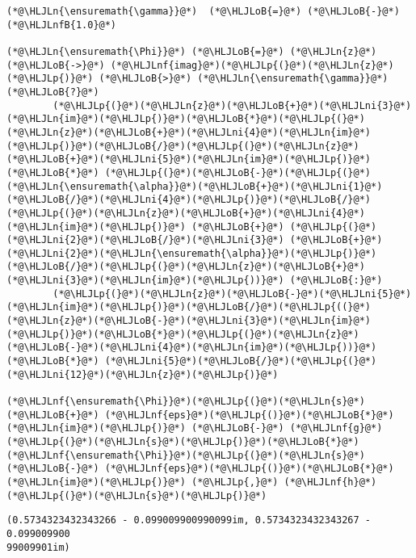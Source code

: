\documentclass[12pt,a4paper]{article}
\newcommand{\HLJLn}[1]{#1}
\newcommand{\HLJLnf}[1]{\textcolor[RGB]{66,102,213}{#1}}
\newcommand{\HLJLnfB}[1]{\textcolor[RGB]{59,151,46}{#1}}
\newcommand{\HLJLni}[1]{\textcolor[RGB]{59,151,46}{#1}}
\newcommand{\HLJLoB}[1]{\textcolor[RGB]{102,102,102}{\textbf{#1}}}
\newcommand{\HLJLp}[1]{#1}
\begin{document}
\begin{lstlisting}
(*@\HLJLn{\ensuremath{\gamma}}@*)  (*@\HLJLoB{=}@*) (*@\HLJLoB{-}@*)(*@\HLJLnfB{1.0}@*)

(*@\HLJLn{\ensuremath{\Phi}}@*) (*@\HLJLoB{=}@*) (*@\HLJLn{z}@*) (*@\HLJLoB{->}@*) (*@\HLJLnf{imag}@*)(*@\HLJLp{(}@*)(*@\HLJLn{z}@*)(*@\HLJLp{)}@*) (*@\HLJLoB{>}@*) (*@\HLJLn{\ensuremath{\gamma}}@*) (*@\HLJLoB{?}@*)
        (*@\HLJLp{(}@*)(*@\HLJLn{z}@*)(*@\HLJLoB{+}@*)(*@\HLJLni{3}@*)(*@\HLJLn{im}@*)(*@\HLJLp{)}@*)(*@\HLJLoB{*}@*)(*@\HLJLp{(}@*)(*@\HLJLn{z}@*)(*@\HLJLoB{+}@*)(*@\HLJLni{4}@*)(*@\HLJLn{im}@*)(*@\HLJLp{)}@*)(*@\HLJLoB{/}@*)(*@\HLJLp{(}@*)(*@\HLJLn{z}@*)(*@\HLJLoB{+}@*)(*@\HLJLni{5}@*)(*@\HLJLn{im}@*)(*@\HLJLp{)}@*) (*@\HLJLoB{*}@*) (*@\HLJLp{(}@*)(*@\HLJLoB{-}@*)(*@\HLJLp{(}@*)(*@\HLJLn{\ensuremath{\alpha}}@*)(*@\HLJLoB{+}@*)(*@\HLJLni{1}@*)(*@\HLJLoB{/}@*)(*@\HLJLni{4}@*)(*@\HLJLp{)}@*)(*@\HLJLoB{/}@*)(*@\HLJLp{(}@*)(*@\HLJLn{z}@*)(*@\HLJLoB{+}@*)(*@\HLJLni{4}@*)(*@\HLJLn{im}@*)(*@\HLJLp{)}@*) (*@\HLJLoB{+}@*) (*@\HLJLp{(}@*)(*@\HLJLni{2}@*)(*@\HLJLoB{/}@*)(*@\HLJLni{3}@*) (*@\HLJLoB{+}@*) (*@\HLJLni{2}@*)(*@\HLJLn{\ensuremath{\alpha}}@*)(*@\HLJLp{)}@*)(*@\HLJLoB{/}@*)(*@\HLJLp{(}@*)(*@\HLJLn{z}@*)(*@\HLJLoB{+}@*)(*@\HLJLni{3}@*)(*@\HLJLn{im}@*)(*@\HLJLp{))}@*) (*@\HLJLoB{:}@*)
        (*@\HLJLp{(}@*)(*@\HLJLn{z}@*)(*@\HLJLoB{-}@*)(*@\HLJLni{5}@*)(*@\HLJLn{im}@*)(*@\HLJLp{)}@*)(*@\HLJLoB{/}@*)(*@\HLJLp{((}@*)(*@\HLJLn{z}@*)(*@\HLJLoB{-}@*)(*@\HLJLni{3}@*)(*@\HLJLn{im}@*)(*@\HLJLp{)}@*)(*@\HLJLoB{*}@*)(*@\HLJLp{(}@*)(*@\HLJLn{z}@*)(*@\HLJLoB{-}@*)(*@\HLJLni{4}@*)(*@\HLJLn{im}@*)(*@\HLJLp{))}@*) (*@\HLJLoB{*}@*) (*@\HLJLni{5}@*)(*@\HLJLoB{/}@*)(*@\HLJLp{(}@*)(*@\HLJLni{12}@*)(*@\HLJLn{z}@*)(*@\HLJLp{)}@*)

(*@\HLJLnf{\ensuremath{\Phi}}@*)(*@\HLJLp{(}@*)(*@\HLJLn{s}@*) (*@\HLJLoB{+}@*) (*@\HLJLnf{eps}@*)(*@\HLJLp{()}@*)(*@\HLJLoB{*}@*)(*@\HLJLn{im}@*)(*@\HLJLp{)}@*) (*@\HLJLoB{-}@*) (*@\HLJLnf{g}@*)(*@\HLJLp{(}@*)(*@\HLJLn{s}@*)(*@\HLJLp{)}@*)(*@\HLJLoB{*}@*)(*@\HLJLnf{\ensuremath{\Phi}}@*)(*@\HLJLp{(}@*)(*@\HLJLn{s}@*) (*@\HLJLoB{-}@*) (*@\HLJLnf{eps}@*)(*@\HLJLp{()}@*)(*@\HLJLoB{*}@*)(*@\HLJLn{im}@*)(*@\HLJLp{)}@*) (*@\HLJLp{,}@*) (*@\HLJLnf{h}@*)(*@\HLJLp{(}@*)(*@\HLJLn{s}@*)(*@\HLJLp{)}@*)
\end{lstlisting}

\begin{lstlisting}
(0.5734323432343266 - 0.099009900990099im, 0.5734323432343267 - 0.099009900
99009901im)
\end{lstlisting}
\end{document}
